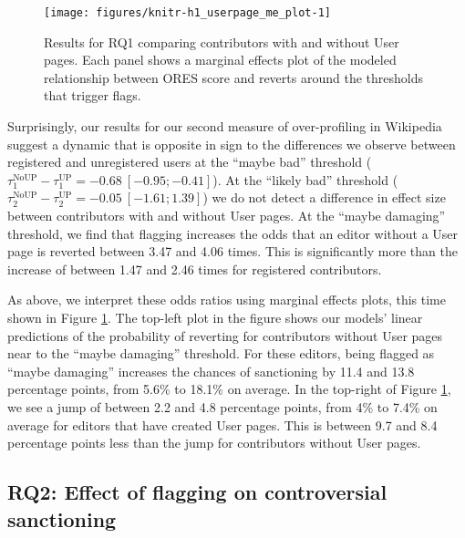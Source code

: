 \documentclass[format=acmsmall, natbib=true,  screen=true]{acmart}
\newenvironment{knitrout}{}{} %
\begin{document}
\begin{figure}[b]
 \centering
\begin{knitrout}
\color{fgcolor}
\texttt{[image: figures/knitr-h1\_userpage\_me\_plot-1]} 

\end{knitrout}
  \caption{Results for RQ1 comparing contributors with and without User pages.
  Each panel shows a marginal effects plot of the modeled relationship between ORES score and reverts around the thresholds that trigger flags.  \label{fig:h1.me.up}}
\end{figure}

Surprisingly, our results for our second measure of over-profiling in Wikipedia suggest a dynamic that is opposite in sign to the differences we observe between registered and unregistered users at the 
``maybe bad'' threshold ($\tau^{\mathrm{NoUP}}_1 - \tau^{\mathrm{UP}}_1 = -0.68~[-0.95;\allowbreak -0.41]$).  At the ``likely bad'' threshold ($\tau^{\mathrm{NoUP}}_2 - \tau^{\mathrm{UP}}_2 = -0.05~[-1.61;\allowbreak 1.39]$) we do not detect a difference in effect size between contributors with and without User pages. 
At the ``maybe damaging'' threshold, we find that flagging increases the odds that an editor without a User page is reverted   between 3.47 and 4.06 times. This is significantly more than the increase of 
between 1.47 and 2.46 times 
 for registered contributors. 

As above, we interpret these odds ratios using marginal effects plots, this time shown in Figure \ref{fig:h1.me.up}.   The top-left plot in the figure shows our models' linear predictions of the probability of reverting for contributors without User pages near to the ``maybe damaging''  threshold.  For these editors, being flagged as ``maybe damaging'' increases the chances of sanctioning by 11.4 and 13.8
percentage points, from 5.6\% to 18.1\% on average. 
In the top-right of Figure \ref{fig:h1.me.up}, we see a jump of between 2.2 and 4.8 percentage points, from  4\% to 7.4\% on average for editors that have created User pages. This is between
 9.7 and 8.4 percentage points less than the jump for contributors without User pages.



\subsection{RQ2: Effect of flagging on controversial sanctioning}
\label{sec:results-rq2}
\end{document}
